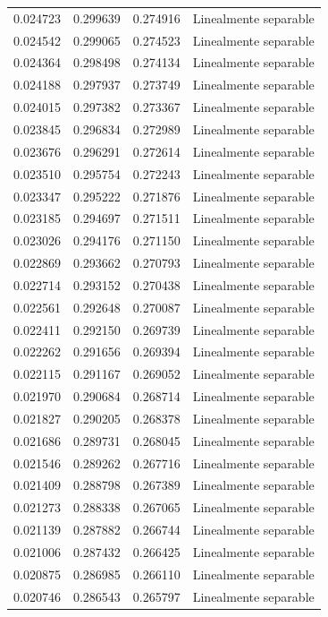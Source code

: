 \begin{tabular}{llll}
0.024723 & 0.299639 & 0.274916 & Linealmente separable \\
0.024542 & 0.299065 & 0.274523 & Linealmente separable \\
0.024364 & 0.298498 & 0.274134 & Linealmente separable \\
0.024188 & 0.297937 & 0.273749 & Linealmente separable \\
0.024015 & 0.297382 & 0.273367 & Linealmente separable \\
0.023845 & 0.296834 & 0.272989 & Linealmente separable \\
0.023676 & 0.296291 & 0.272614 & Linealmente separable \\
0.023510 & 0.295754 & 0.272243 & Linealmente separable \\
0.023347 & 0.295222 & 0.271876 & Linealmente separable \\
0.023185 & 0.294697 & 0.271511 & Linealmente separable \\
0.023026 & 0.294176 & 0.271150 & Linealmente separable \\
0.022869 & 0.293662 & 0.270793 & Linealmente separable \\
0.022714 & 0.293152 & 0.270438 & Linealmente separable \\
0.022561 & 0.292648 & 0.270087 & Linealmente separable \\
0.022411 & 0.292150 & 0.269739 & Linealmente separable \\
0.022262 & 0.291656 & 0.269394 & Linealmente separable \\
0.022115 & 0.291167 & 0.269052 & Linealmente separable \\
0.021970 & 0.290684 & 0.268714 & Linealmente separable \\
0.021827 & 0.290205 & 0.268378 & Linealmente separable \\
0.021686 & 0.289731 & 0.268045 & Linealmente separable \\
0.021546 & 0.289262 & 0.267716 & Linealmente separable \\
0.021409 & 0.288798 & 0.267389 & Linealmente separable \\
0.021273 & 0.288338 & 0.267065 & Linealmente separable \\
0.021139 & 0.287882 & 0.266744 & Linealmente separable \\
0.021006 & 0.287432 & 0.266425 & Linealmente separable \\
0.020875 & 0.286985 & 0.266110 & Linealmente separable \\
0.020746 & 0.286543 & 0.265797 & Linealmente separable \\

\end{tabular}
